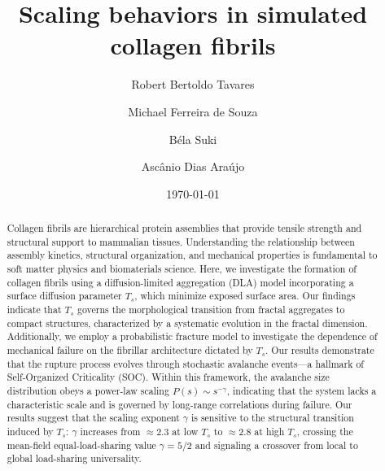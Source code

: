 \documentclass[aps,physrev,preprint,groupedaddress,linenumbers]{revtex4-2}
\begin{document}

\title{\textbf{Scaling behaviors in simulated collagen fibrils}}

\author{Robert Bertoldo Tavares}

\author{Michael Ferreira de Souza}

\author{B\'ela Suki}

\author{Ascânio Dias Araújo}


\date{\today}

\begin{abstract}
Collagen fibrils are hierarchical protein assemblies that provide tensile strength and structural support to mammalian tissues. Understanding the relationship between assembly kinetics, structural organization, and mechanical properties is fundamental to soft matter physics and biomaterials science. Here, we investigate the formation of collagen fibrils using a diffusion-limited aggregation (DLA) model incorporating a surface diffusion parameter $T_s$, which minimize exposed surface area. Our findings indicate that $T_{s}$  governs the morphological transition from fractal aggregates to compact structures, characterized by a systematic evolution in the fractal dimension. Additionally, we employ a probabilistic fracture model to investigate the dependence of mechanical failure on the fibrillar architecture dictated by $T_s$. Our results demonstrate that the rupture process evolves through stochastic avalanche events—a hallmark of Self-Organized Criticality (SOC). Within this framework, the avalanche size distribution obeys a power-law scaling $P(s)\sim s^{-\gamma}$, indicating that the system lacks a characteristic scale and is governed by long-range correlations during failure.
Our results suggest that the scaling exponent $\gamma$ is sensitive to the structural transition induced by $T_{s}$: $\gamma$ increases from $\approx 2.3$ at low $T_s$ to $\approx 2.8$ at high $T_s$, crossing the mean-field equal-load-sharing value $\gamma=5/2$ and signaling a crossover from local to global load-sharing universality.
\end{abstract}
\end{document}
